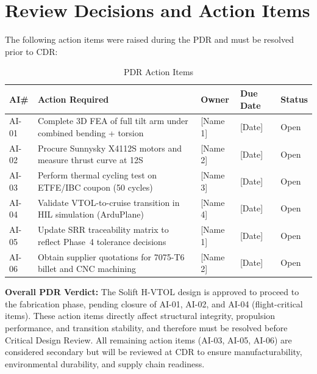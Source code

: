 \section{Review Decisions and Action Items}
\label{sec:pdr_actions}

The following action items were raised during the PDR and must be resolved prior to CDR:

\begin{table}[H]
\centering
\caption{PDR Action Items}
\label{tab:actions}
\begin{tabularx}{\textwidth}{C{1cm} L{5cm} L{3cm} C{2cm} C{1.5cm}}
\toprule
\textbf{AI\#} & \textbf{Action Required} & \textbf{Owner} & \textbf{Due Date} & \textbf{Status} \\
\midrule
AI-01 & Complete 3D FEA of full tilt arm under combined bending + torsion & [Name 1] & [Date] & Open \\
AI-02 & Procure Sunnysky X4112S motors and measure thrust curve at 12S & [Name 2] & [Date] & Open \\
AI-03 & Perform thermal cycling test on ETFE/IBC coupon (50 cycles) & [Name 3] & [Date] & Open \\
AI-04 & Validate VTOL-to-cruise transition in HIL simulation (ArduPlane) & [Name 4] & [Date] & Open \\
AI-05 & Update SRR traceability matrix to reflect Phase~4 tolerance decisions & [Name 1] & [Date] & Open \\
AI-06 & Obtain supplier quotations for 7075-T6 billet and CNC machining & [Name 2] & [Date] & Open \\
\bottomrule
\end{tabularx}
\end{table}

\noindent \textbf{Overall PDR Verdict:} The Solift H-VTOL design is approved to proceed to the fabrication phase, pending closure of AI-01, AI-02, and AI-04 (flight-critical items). These action items directly affect structural integrity, propulsion performance, and transition stability, and therefore must be resolved before Critical Design Review. All remaining action items (AI-03, AI-05, AI-06) are considered secondary but will be reviewed at CDR to ensure manufacturability, environmental durability, and supply chain readiness.

